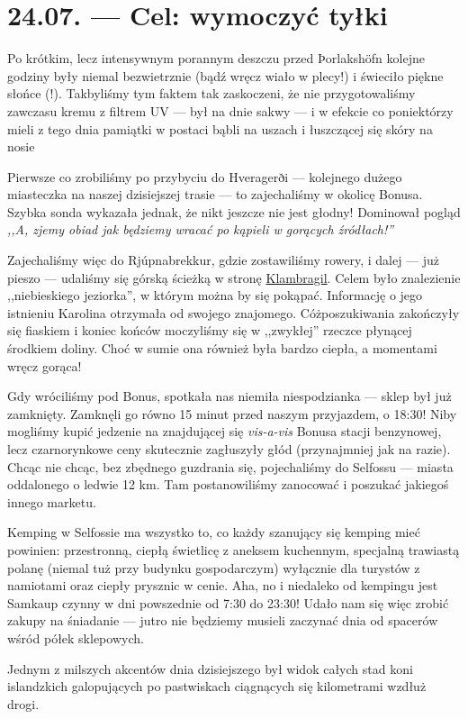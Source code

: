 \chapter*{24.07. --- Cel: wymoczyć tyłki}

Po krótkim, lecz intensywnym porannym deszczu przed Þorlakshöfn kolejne godziny były niemal bezwietrznie (bądź wręcz wiało w plecy!) i świeciło piękne słońce (!). Tak\textellipsis byliśmy tym faktem tak zaskoczeni, że nie przygotowaliśmy zawczasu kremu z filtrem UV --- był na dnie sakwy --- i w efekcie co poniektórzy mieli z tego dnia pamiątki w postaci bąbli na uszach i łuszczącej się skóry na nosie\textellipsis

Pierwsze co zrobiliśmy po przybyciu do Hveragerði --- kolejnego dużego miasteczka na naszej dzisiejszej trasie --- to zajechaliśmy w okolicę Bonusa. Szybka sonda wykazała jednak, że nikt jeszcze nie jest głodny! Dominował pogląd \emph{,,A, zjemy obiad jak będziemy wracać po kąpieli w gorących źródłach!''}

Zajechaliśmy więc do Rjúpnabrekkur, gdzie zostawiliśmy rowery, i dalej --- już pieszo --- udaliśmy się górską ścieżką w stronę \href{http://www.vulkaner.no/t/isl2004/hot.html}{Klambragil}. Celem było znalezienie ,,niebieskiego jeziorka'', w którym można by się pokąpać. Informację o jego istnieniu Karolina otrzymała od swojego znajomego. Cóż\textellipsis poszukiwania zakończyły się fiaskiem i koniec końców moczyliśmy się w ,,zwykłej'' rzeczce płynącej środkiem doliny. Choć w sumie ona również była bardzo ciepła, a momentami wręcz gorąca!


Gdy wróciliśmy pod Bonus, spotkała nas niemiła niespodzianka --- sklep był już zamknięty. Zamknęli go równo 15 minut przed naszym przyjazdem, o 18:30! Niby mogliśmy kupić jedzenie na znajdującej się \emph{vis-a-vis} Bonusa stacji benzynowej, lecz czarnorynkowe ceny skutecznie zagłuszyły głód (przynajmniej jak na razie). Chcąc nie chcąc, bez zbędnego guzdrania się, pojechaliśmy do Selfossu --- miasta oddalonego o ledwie 12 km. Tam postanowiliśmy zanocować i poszukać jakiegoś innego marketu.

Kemping w Selfossie ma wszystko to, co każdy szanujący się kemping mieć powinien: przestronną, ciepłą świetlicę z aneksem kuchennym, specjalną trawiastą polanę (niemal tuż przy budynku gospodarczym) wyłącznie dla turystów z namiotami oraz ciepły prysznic w cenie. Aha, no i niedaleko od kempingu jest Samkaup czynny w dni powszednie od 7:30 do 23:30! Udało nam się więc zrobić zakupy na śniadanie --- jutro nie będziemy musieli zaczynać dnia od spacerów wśród półek sklepowych.

Jednym z milszych akcentów dnia dzisiejszego był widok całych stad koni islandzkich galopujących po pastwiskach ciągnących się kilometrami wzdłuż drogi.